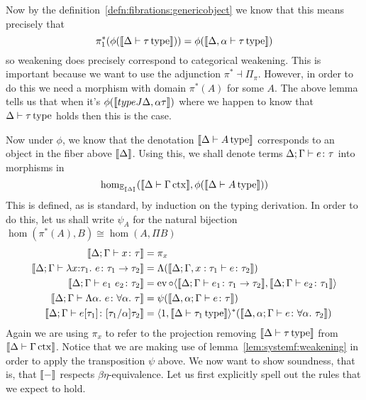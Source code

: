 Now by the definition~\ref{defn:fibrations:genericobject} we know that
this means precisely that
\[
  \pi_1^*(\phi(\llbracket \Delta \vdash \tau\,\mathrm{type} \rrbracket)) = \phi(\llbracket \Delta, \alpha \vdash \tau\,\mathrm{type} \rrbracket)
\]
so weakening does precisely correspond to categorical weakening. This
is important because we want to use the adjunction
$\pi^* \dashv \Pi_\pi$. However, in order to do this we need a
morphism with domain $\pi^*(A)$ for some $A$. The above lemma tells us
that when it's $\phi(\llbracket typeJ{\Delta, \alpha}{\tau} \rrbracket)$ where we
happen to know that $\Delta \vdash \tau\,\mathrm{type}$ holds then this is the case.

Now under $\phi$, we know that the denotation
$\llbracket \Delta \vdash A\,\mathrm{type} \rrbracket$ corresponds to an object in the fiber
above $\llbracket \Delta \rrbracket$. Using this, we shall denote terms
$\Delta; \Gamma \vdash e \colon \tau$ into morphisms in
\[
  \hom_{\mathbb{E}_{\llbracket \Delta \rrbracket}}(\llbracket \Delta \vdash \Gamma\,\mathrm{ctx} \rrbracket, \phi(\llbracket \Delta \vdash A\,\mathrm{type} \rrbracket))
\]
This is defined, as is standard, by induction on the typing
derivation. In order to do this, let us shall write $\psi_A$ for the
natural bijection $\hom(\pi^*(A), B) \cong \hom(A, \Pi B)$
\begin{align*}
  \llbracket \Delta; \Gamma \vdash x \colon \tau \rrbracket &= \pi_x\\
  \llbracket \Delta; \Gamma \vdash \lambda x \mathord{:} \tau_1.\ e \colon \tau_1 \to \tau_2 \rrbracket &=
  \Lambda(\llbracket \Delta; \Gamma, x : \tau_1 \vdash e \colon \tau_2 \rrbracket)\\
  \llbracket \Delta; \Gamma \vdash e_1\ e_2 \colon \tau_2 \rrbracket &=
  \operatorname{ev} \circ
  \langle \llbracket \Delta; \Gamma \vdash e_1 \colon \tau_1 \to \tau_2 \rrbracket, \llbracket \Delta; \Gamma \vdash e_2 \colon \tau_1 \rrbracket \rangle\\
  \llbracket \Delta; \Gamma \vdash \Lambda \alpha.\ e \colon \forall \alpha.\ \tau \rrbracket &=
  \psi(\llbracket \Delta, \alpha; \Gamma \vdash e \colon \tau \rrbracket)\\
  \llbracket \Delta; \Gamma \vdash e[\tau_1] \colon [\tau_1/\alpha]\tau_2 \rrbracket &=
  \langle 1, \llbracket \Delta \vdash \tau_1\,\mathrm{type} \rrbracket\rangle^*(\llbracket \Delta, \alpha; \Gamma \vdash e \colon \forall \alpha.\ \tau_2 \rrbracket)
\end{align*}
Again we are using $\pi_x$ to refer to the projection removing
$\llbracket \Delta \vdash \tau\,\mathrm{type} \rrbracket$ from
$\llbracket \Delta \vdash \Gamma\,\mathrm{ctx} \rrbracket$. Notice that we are making use of
lemma~\ref{lem:systemf:weakening} in order to apply the transposition
$\psi$ above. We now want to show soundness, that is, that
$\llbracket - \rrbracket$ respects $\beta\eta$-equivalence. Let us first explicitly
spell out the rules that we expect to hold.
